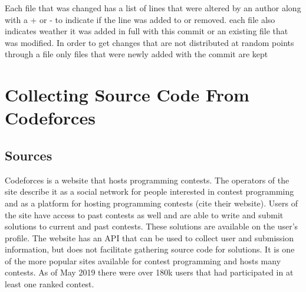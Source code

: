 \documentclass{article}
\begin{document}
Each file that was changed has a list of lines that were altered by an author along with a + or - to indicate if the line was added to or removed. each file also indicates weather it was added in full with this commit or an existing file that was modified. In order to get changes that are not distributed at random points through a file only files that were newly added with the commit are kept


\section{Collecting Source Code From Codeforces}


\subsection{Sources}
Codeforces is a website that hosts programming contests. The operators of the site describe it as a social network for people interested in contest programming and as a platform for hosting programming contests (cite their website). Users of the site have access to past contests as well and are able to write and submit solutions to current and past contests. These solutions are available on the user's profile. The website has an API that can be used to collect user and submission information, but does not facilitate gathering source code for solutions. It is one of the more popular sites available for contest programming and hosts many contests. As of May 2019 there were over 180k users that had participated in at least one ranked contest.

\end{document}
